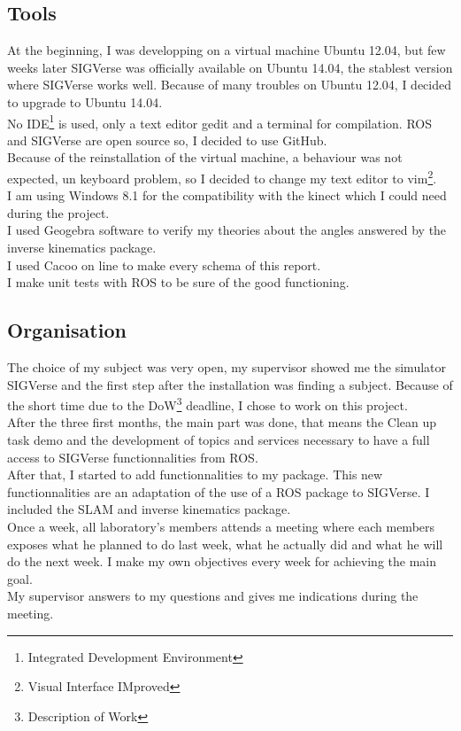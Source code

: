 \subsection{Tools}
At the beginning, I was developping on a virtual machine Ubuntu 12.04, but few weeks later SIGVerse was officially available on Ubuntu 14.04, the stablest version where SIGVerse works well. Because of many troubles on Ubuntu 12.04, I decided to upgrade to Ubuntu 14.04.\\
No IDE\footnote{Integrated Development Environment} is used, only a text editor gedit and a terminal for compilation. ROS and SIGVerse are open source so, I decided to use GitHub.\\
Because of the reinstallation of the virtual machine, a behaviour was not expected, un keyboard problem, so I decided to change my text editor to vim\footnote{Visual Interface IMproved}.\\ 
I am using Windows 8.1 for the compatibility with the kinect which I could need during the project.\\

I used Geogebra software to verify my theories about the angles answered by the inverse kinematics package.\\

I used Cacoo on line to make every schema of this report.\\

I make unit tests with ROS to be sure of the good functioning.

\subsection{Organisation}
The choice of my subject was very open, my supervisor showed me the simulator SIGVerse and the first step after the installation was finding a subject. Because of the short time due to the DoW\footnote{Description of Work} deadline, I chose to work on this project.\\
After the three first months, the main part was done, that means the Clean up task demo and the development of topics and services necessary to have a full access to SIGVerse functionnalities from ROS.\\
After that, I started to add functionnalities to my package. This new functionnalities are an adaptation of the use of a ROS package to SIGVerse. I included the SLAM and inverse kinematics package.\\

Once a week, all laboratory's members attends a meeting where each members exposes what he planned to do last week, what he actually did and what he will do the next week. I make my own objectives every week for achieving the main goal.\\
My supervisor answers to my questions and gives me indications during the meeting.

